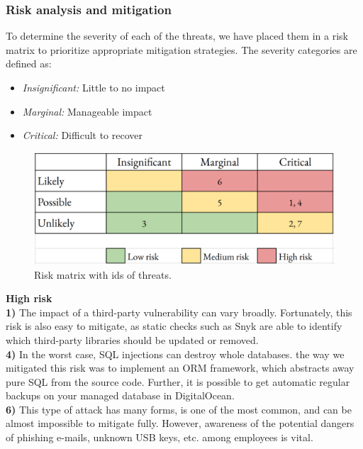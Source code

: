 \subsubsection{Risk analysis and mitigation}

To determine the severity of each of the threats, we have placed them in a risk matrix to prioritize appropriate mitigation strategies. The severity categories are defined as: 
\begin{itemize}
    \item \textit{Insignificant:} Little to no impact 
    \item \textit{Marginal:} Manageable impact 
    \item \textit{Critical:} Difficult to recover
\end{itemize}

\begin{figure}[H]
    \centering
    \includegraphics[width=.5\linewidth]{images/risk-matrix.png}
    \caption{Risk matrix with ids of threats.}
    \label{fig:risk}
\end{figure}


\noindent \textbf{High risk}\\
\indent \textbf{1)} The impact of a third-party vulnerability can vary broadly. Fortunately, this risk is also easy to mitigate, as static checks such as Snyk \cite{snyk} are able to identify which third-party libraries should be updated or removed.\\ 

\textbf{4)} In the worst case, SQL injections can destroy whole databases. the way we mitigated this risk was to implement an ORM framework, which abstracts away pure SQL from the source code. Further, it is possible to get automatic regular backups on your managed database in DigitalOcean.\\ 
    
\textbf{6)} This type of attack has many forms, is one of the most common, and can be almost impossible to mitigate fully. However, awareness of the potential dangers of phishing e-mails, unknown USB keys, etc. among employees is vital.\\  

